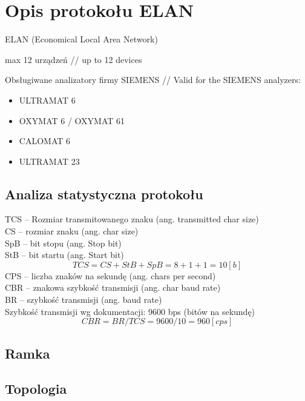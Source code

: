 \section{Opis protokołu ELAN}

ELAN (Economical Local Area Network)

max 12 urządzeń  // up to 12 devices

Obsługiwane analizatory firmy SIEMENS // Valid for the SIEMENS analyzers:
\begin{itemize}
\item ULTRAMAT 6
\item OXYMAT 6 / OXYMAT 61
\item CALOMAT 6
\item ULTRAMAT 23
\end{itemize}

\subsection{Analiza statystyczna protokołu}
TCS -- Rozmiar transmitowanego znaku (ang. transmitted char size)\\
CS -- rozmiar znaku (ang. char size)\\
SpB -- bit stopu (ang. Stop bit) \\
StB -- bit startu (ang. Start bit)
$$TCS = CS + StB + SpB= 8+1+1=10 [b]$$
CPS -- liczba znaków na sekundę (ang. chars per second) \\
CBR -- znakowa szybkość transmisji (ang. char baud rate) \\
BR -- szybkość transmisji (ang. baud rate) \\
Szybkość transmisji wg dokumentacji: 9600 bps (bitów na sekundę)
$$CBR=BR/TCS=9600/10=960 [cps]$$

\subsection{Ramka}

\subsection{Topologia}
